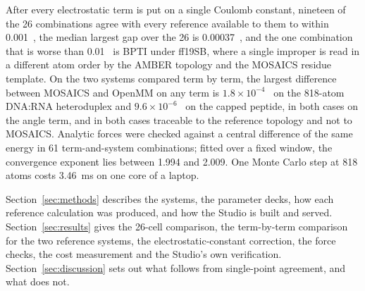 After every electrostatic term is put on a single Coulomb constant, nineteen of
the 26 combinations agree with every reference available to them to within
0.001~\kcal{}, the median largest gap over the 26 is 0.00037~\kcal{}, and the
one combination that is worse than 0.01~\kcal{} is BPTI under ff19SB, where a
single improper is read in a different atom order by the AMBER topology and the
MOSAICS residue template. On the two systems compared term by term, the largest
difference between MOSAICS and OpenMM on any term is $1.8\times10^{-4}$~\kcal{}
on the 818-atom DNA:RNA heteroduplex and $9.6\times10^{-6}$~\kcal{} on the
capped peptide, in both cases on the angle term, and in both cases traceable to
the reference topology and not to MOSAICS. Analytic forces were checked against
a central difference of the same energy in 61 term-and-system combinations;
fitted over a fixed window, the convergence exponent lies between 1.994 and
2.009. One Monte Carlo step at 818 atoms costs 3.46~ms on one core of a laptop.

Section~\ref{sec:methods} describes the systems, the parameter decks, how each
reference calculation was produced, and how the Studio is built and served.
Section~\ref{sec:results} gives the 26-cell comparison, the term-by-term
comparison for the two reference systems, the electrostatic-constant correction,
the force checks, the cost measurement and the Studio's own verification.
Section~\ref{sec:discussion} sets out what follows from single-point agreement,
and what does not.
